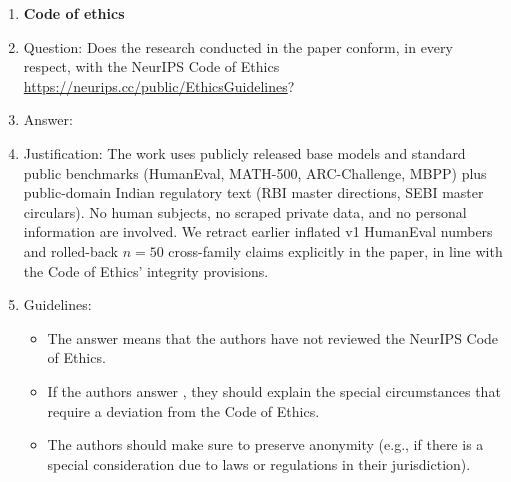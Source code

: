 \begin{enumerate}
\item {\bf Code of ethics}
    \item[] Question: Does the research conducted in the paper conform, in every respect, with the NeurIPS Code of Ethics \url{https://neurips.cc/public/EthicsGuidelines}?
    \item[] Answer: \answerYes{}
    \item[] Justification: The work uses publicly released base models and standard public benchmarks (HumanEval, MATH-500, ARC-Challenge, MBPP) plus public-domain Indian regulatory text (RBI master directions, SEBI master circulars). No human subjects, no scraped private data, and no personal information are involved. We retract earlier inflated v1 HumanEval numbers and rolled-back $n{=}50$ cross-family claims explicitly in the paper, in line with the Code of Ethics' integrity provisions.
    \item[] Guidelines:
    \begin{itemize}
        \item The answer \answerNA{} means that the authors have not reviewed the NeurIPS Code of Ethics.
        \item If the authors answer \answerNo, they should explain the special circumstances that require a deviation from the Code of Ethics.
        \item The authors should make sure to preserve anonymity (e.g., if there is a special consideration due to laws or regulations in their jurisdiction).
    \end{itemize}



\end{enumerate}
